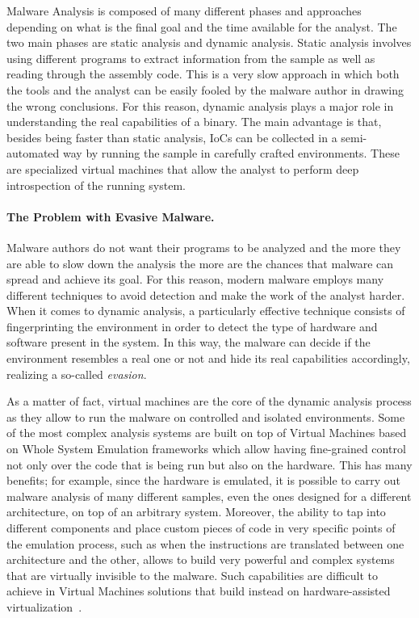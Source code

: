 Malware Analysis is composed of many different phases and approaches depending on what is the final goal and the time available for the analyst. The two main phases are static analysis and dynamic analysis. Static analysis involves using different programs to extract information from the sample as well as reading through the assembly code. This is a very slow approach in which both the tools and the analyst can be easily fooled by the malware author in drawing the wrong conclusions. For this reason, dynamic analysis plays a major role in understanding the real capabilities of a binary. The main advantage is that, besides being faster than static analysis, IoCs can be collected in a semi-automated way by running the sample in carefully crafted environments. These are specialized virtual machines that allow the analyst to perform deep introspection of the running system.

\paragraph{The Problem with Evasive Malware.}
Malware authors do not want their programs to be analyzed and the more they are able to slow down the analysis the more are the chances that malware can spread and achieve its goal. For this reason, modern malware employs many different techniques to avoid detection and make the work of the analyst harder. When it comes to dynamic analysis, a particularly effective technique consists of fingerprinting the environment in order to detect the type of hardware and software present in the system. In this way, the malware can decide if the environment resembles a real one or not and hide its real capabilities accordingly, realizing a so-called \textit{evasion}.

As a matter of fact, virtual machines are the core of the dynamic analysis process as they allow to run the malware on controlled and isolated environments. Some of the most complex analysis systems are built on top of Virtual Machines based on Whole System Emulation frameworks which allow having fine-grained control not only over the code that is being run but also on the hardware. This has many benefits; for example, since the hardware is emulated, it is possible to carry out malware analysis of many different samples, even the ones designed for a different architecture, on top of an arbitrary system. Moreover, the ability to tap into different components and place custom pieces of code in very specific points of the emulation process, such as when the instructions are translated between one architecture and the other, allows to build very powerful and complex systems that are virtually invisible to the malware. Such capabilities are difficult to achieve in Virtual Machines solutions that build instead on hardware-assisted virtualization~\cite{}.

